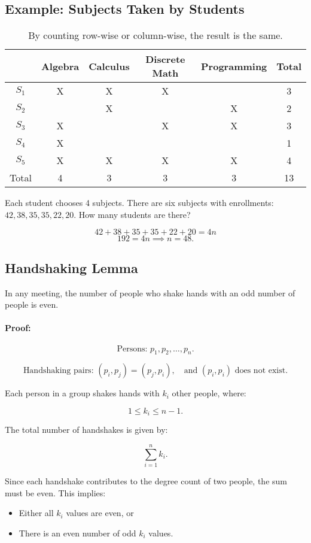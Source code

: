 \documentclass[11pt]{article}
\begin{document}
\subsection*{Example: Subjects Taken by Students}
\begin{table}[h]
\centering
\begin{tabular}{|c|c|c|c|c|c|}
\hline
 & Algebra & Calculus & Discrete Math & Programming & Total \\
\hline
$S_1$ & X & X & X &   & 3 \\
$S_2$ &   & X &   & X & 2 \\
$S_3$ & X &   & X & X & 3 \\
$S_4$ & X &   &   &   & 1 \\
$S_5$ & X & X & X & X & 4 \\
\hline
Total & 4 & 3 & 3 & 3 & 13 \\
\hline
\end{tabular}
\caption{By counting row-wise or column-wise, the result is the same.}
\end{table}

Each student chooses 4 subjects. There are six subjects with enrollments: $42, 38, 35, 35, 22, 20$. 
How many students are there?

\[
42 + 38 + 35 + 35 + 22 + 20 = 4n
\]
\[
192 = 4n \implies n = 48.
\]

\subsection{Handshaking Lemma}
In any meeting, the number of people who shake hands with an odd number of people is even.

\paragraph{Proof:}
\[
\text{Persons: } p_1, p_2, \dots, p_n.
\]

\[
\text{Handshaking pairs: } (p_i, p_j) = (p_j, p_i), \quad \text{and } (p_i, p_i) \text{ does not exist.}
\]

Each person in a group shakes hands with $ k_i $ other people, where:

\[
1 \leq k_i \leq n - 1.
\]

The total number of handshakes is given by:

\[
\sum_{i=1}^{n} k_i.
\]

Since each handshake contributes to the degree count of two people, the sum must be even. This implies:
\begin{itemize}
    \item Either all $ k_i $ values are even, or
    \item There is an even number of odd $ k_i $ values.
\end{itemize}
\end{document}
